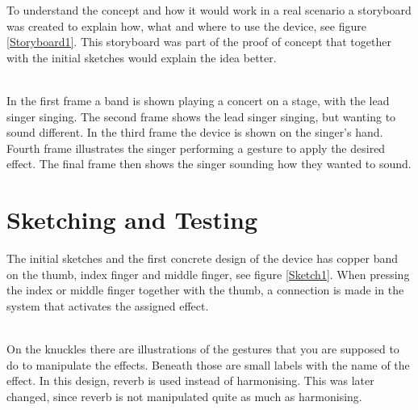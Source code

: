 To understand the concept and how it would work in a real scenario a storyboard was created to explain how, what and where to use the device, see figure \ref{Storyboard1}. This storyboard was part of the proof of concept that together with the initial sketches would explain the idea better.\\

\begin{minipage}{\linewidth}%
\label{Storyboard1}
\end{minipage}\\

In the first frame a band is shown playing a concert on a stage, with the lead singer singing. The second frame shows the lead singer singing, but wanting to sound different. In the third frame the device is shown on the singer's hand. Fourth frame illustrates the singer performing a gesture to apply the desired effect. The final frame then shows the singer sounding how they wanted to sound.

\section{Sketching and Testing}

The initial sketches and the first concrete design of the device has copper band on the thumb, index finger and middle finger, see figure \ref{Sketch1}. When pressing the index or middle finger together with the thumb, a connection is made in the system that activates the assigned effect. \\

\begin{minipage}{\linewidth}%
\label{Sketch1}
\end{minipage}\\

On the knuckles there are illustrations of the gestures that you are supposed to do to manipulate the effects. Beneath those are small labels with the name of the effect. In this design, reverb is used instead of harmonising. This was later changed, since reverb is not manipulated quite as much as harmonising.

